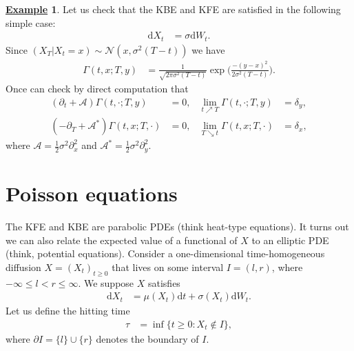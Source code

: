 \documentclass[12pt]{book}
\numberwithin{equation}{chapter}
\theoremstyle{plain}
\numberwithin{theorem}{section}
\theoremstyle{definition}
\newtheorem{example}[theorem]{\underline{Example}}
\numberwithin{exercise}{chapter}
\newcommand{\<}{\langle}
\renewcommand{\>}{\rangle}
\renewcommand{\(}{\left(}
\renewcommand{\)}{\right)}
\renewcommand{\[}{\left[}
\renewcommand{\]}{\right]}
\newcommand\Ac{\mathscr{A}}
\newcommand\Nc{\mathscr{N}}
\newcommand\sig{\sigma}
\newcommand\Gam{\Gamma}
\newcommand\del{\delta}
\renewcommand\d{\partial}
\newcommand\dd{\mathrm{d}}
\begin{document}
\begin{example}
Let us check that the KBE and KFE are satisfied in the following simple case:
\begin{align}
\dd X_t
	&=	\sig \dd W_t .
\end{align}
Since $(X_T | X_t = x) \sim \Nc(x,\sig^2(T-t))$ we have
\begin{align}
\Gam(t,x;T,y)
	&=	\frac{1}{\sqrt{2\pi \sig^2(T-t)}} \exp \Big( \frac{-(y-x)^2}{2 \sig^2(T-t)} \Big) .
\end{align}
Once can check by direct computation that
\begin{align}
(\d_t + \Ac) \Gam(t,\cdot;T,y)
	&=	0 , &
\lim_{t \nearrow T} \Gam(t,\cdot;T,y)
	&=	\del_y , \\
(-\d_T + \Ac^*) \Gam(t,x;T,\cdot)
	&=	0 , &
\lim_{T \searrow t} \Gam(t,x;T,\cdot)
	&=	\del_x ,
\end{align}
where $\Ac = \tfrac{1}{2} \sig^2 \d_x^2$ and $\Ac^* = \tfrac{1}{2} \sig^2 \d_y^2$.
\end{example}


\section{Poisson equations}
The KFE and KBE are parabolic PDEs (think heat-type equations).  It turns out we can also relate the expected value of a functional of $X$ to an elliptic PDE (think, potential equations).  Consider a one-dimensional time-homogeneous diffusion $X = (X_t)_{t \geq 0}$ that lives on some interval $I = (l,r)$, where $-\infty \leq l < r \leq \infty$.  We suppose $X$ satisfies
\begin{align}
\dd X_t
	&=	\mu(X_t) \dd t + \sig(X_t) \dd W_t . \label{eq:dX.th}
\end{align}
Let us define the hitting time
\begin{align}
\tau
	&=	\inf\{ t \geq 0 : X_t \notin I \} , \label{eq:tau.dI}
\end{align}
where $\d I = \{l\} \cup \{r\}$ denotes the boundary of $I$.  
\end{document}
